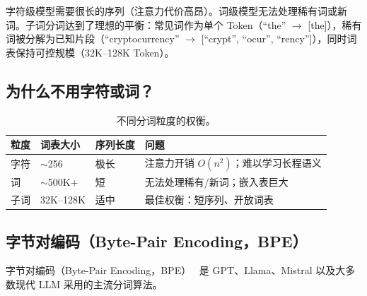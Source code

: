 \begin{intuitionbox}[为什么用子词？]
字符级模型需要很长的序列（注意力代价高昂）。词级模型无法处理稀有词或新词。子词分词达到了理想的平衡：常见词作为单个 Token（``the'' $\to$ [the]），稀有词被分解为已知片段（``cryptocurrency'' $\to$ [``crypt'', ``ocur'', ``rency'']），同时词表保持可控规模（32K--128K Token）。
\end{intuitionbox}

\subsection{为什么不用字符或词？}
\label{why-not-characters-or-words}

\begin{table}[ht!]
\centering
\caption{不同分词粒度的权衡。}
\begin{tabular}{@{}l l l l@{}}
\toprule
\textbf{粒度} & \textbf{词表大小} & \textbf{序列长度} & \textbf{问题} \\
\midrule
字符 & $\sim$256 & 极长 & 注意力开销 $O(n^2)$；难以学习长程语义 \\
词 & $\sim$500K+ & 短 & 无法处理稀有/新词；嵌入表巨大 \\
子词 & 32K--128K & 适中 & 最佳权衡：短序列、开放词表 \\
\bottomrule
\end{tabular}
\end{table}

\subsection{字节对编码（Byte-Pair Encoding，BPE）}
\label{byte-pair-encoding-bpe}

字节对编码（Byte-Pair Encoding，BPE）~\cite{sennrich2016bpe} 是 GPT、Llama、Mistral 以及大多数现代 LLM 采用的主流分词算法。


